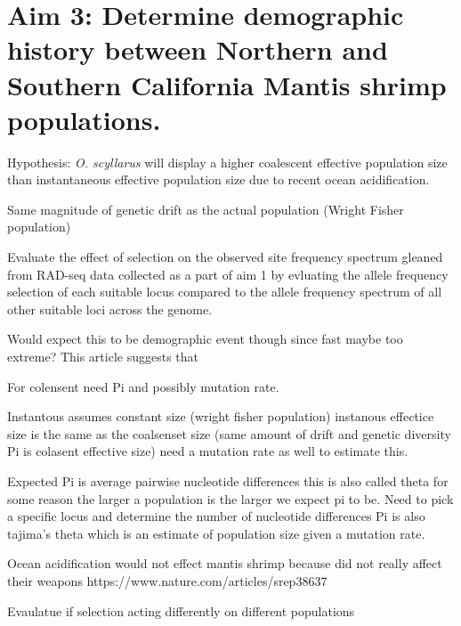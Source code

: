\documentclass[11pt]{article}
\begin{document}
\section*{Aim 3: Determine demographic history between Northern and Southern California Mantis shrimp populations.}

Hypothesis: \emph{O. scyllarus} will display a higher coalescent effective population size than instantaneous effective population size due to recent ocean acidification. 

Same magnitude of genetic drift as the actual population (Wright Fisher population)

Evaluate the effect of selection on the observed site frequency spectrum gleaned from RAD-seq data collected as a part of aim 1 by evluating the allele frequency selection of each suitable locus compared to the allele frequency spectrum of all other suitable loci across the genome. 

Would expect this to be demographic event though since fast maybe too extreme? This article suggests that 

For colensent need Pi and possibly mutation rate.

Instantous assumes constant size (wright fisher population) instanous effectice size is the same
as the coalsenset size (same amount of drift and genetic diversity Pi is colasent effective size) need a mutation rate as well to estimate this.

Expected Pi is average pairwise nucleotide differences this is also called theta for some reason
the larger a population is the larger we expect pi to be. Need to pick a specific locus and determine the number of nucleotide differences Pi is also tajima's theta which is an estimate of population size given a mutation rate. 

Ocean acidification would not effect mantis shrimp because did not really affect their weapons
https://www.nature.com/articles/srep38637

Evaulatue if selection acting differently on different populations 
\end{document}
